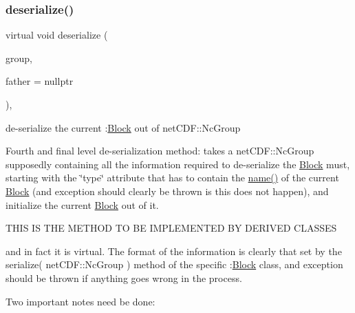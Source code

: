 \subsubsection{\texorpdfstring{deserialize()}{deserialize()}}
{\footnotesize\ttfamily virtual void deserialize (\begin{DoxyParamCaption}\item[{net\+C\+D\+F\+::\+Nc\+Group \&\&}]{group,  }\item[{\mbox{\hyperlink{class_s_m_spp__di__unipi__it_1_1_block}{Block}} $\ast$}]{father = {\ttfamily nullptr} }\end{DoxyParamCaption})\hspace{0.3cm}{\ttfamily [override]}, {\ttfamily [virtual]}}



de-\/serialize the current \+:\mbox{\hyperlink{class_s_m_spp__di__unipi__it_1_1_block}{Block}} out of net\+C\+D\+F\+::\+Nc\+Group 

Fourth and final level de-\/serialization method\+: takes a net\+C\+D\+F\+::\+Nc\+Group supposedly containing all the information required to de-\/serialize the \mbox{\hyperlink{class_s_m_spp__di__unipi__it_1_1_block}{Block}} must, starting with the \char`\"{}type\char`\"{} attribute that has to contain the \mbox{\hyperlink{class_s_m_spp__di__unipi__it_1_1_block_a738e9dfd6e00507da219e4bd5a3f6be9}{name()}} of the current \mbox{\hyperlink{class_s_m_spp__di__unipi__it_1_1_block}{Block}} (and exception should clearly be thrown is this does not happen), and initialize the current \mbox{\hyperlink{class_s_m_spp__di__unipi__it_1_1_block}{Block}} out of it. \begin{DoxyVerb} THIS IS THE METHOD TO BE IMPLEMENTED BY DERIVED CLASSES
\end{DoxyVerb}


and in fact it is virtual. The format of the information is clearly that set by the serialize( net\+C\+D\+F\+::\+Nc\+Group ) method of the specific \+:\mbox{\hyperlink{class_s_m_spp__di__unipi__it_1_1_block}{Block}} class, and exception should be thrown if anything goes wrong in the process.

Two important notes need be done\+:


